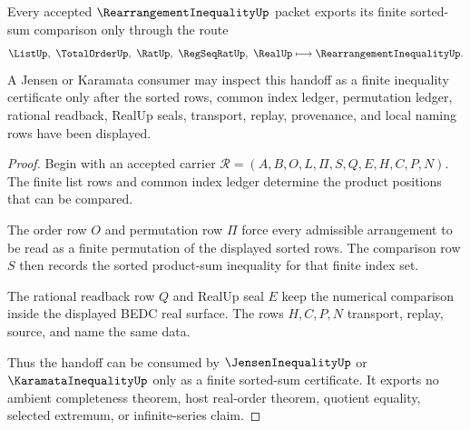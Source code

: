 \begin{theorem}
\label{thm:rearrangement-inequality-sorted-sum-handoff}
Every accepted $\RearrangementInequalityUp$ packet exports its finite sorted-sum comparison only through the route
$$
\ListUp,\ \TotalOrderUp,\ \RatUp,\ \RegSeqRatUp,\ \RealUp
\longmapsto
\RearrangementInequalityUp .
$$
A Jensen or Karamata consumer may inspect this handoff as a finite inequality certificate only after the sorted rows, common index ledger, permutation ledger, rational readback, RealUp seals, transport, replay, provenance, and local naming rows have been displayed.
\end{theorem}
\begin{proof}
Begin with an accepted carrier $\mathcal{R}=(A,B,O,L,\Pi,S,Q,E,H,C,P,N)$. The finite list rows and common index ledger determine the product positions that can be compared.

The order row $O$ and permutation row $\Pi$ force every admissible arrangement to be read as a finite permutation of the displayed sorted rows. The comparison row $S$ then records the sorted product-sum inequality for that finite index set.

The rational readback row $Q$ and RealUp seal $E$ keep the numerical comparison inside the displayed BEDC real surface. The rows $H,C,P,N$ transport, replay, source, and name the same data.

Thus the handoff can be consumed by $\JensenInequalityUp$ or $\KaramataInequalityUp$ only as a finite sorted-sum certificate. It exports no ambient completeness theorem, host real-order theorem, quotient equality, selected extremum, or infinite-series claim.
\end{proof}



